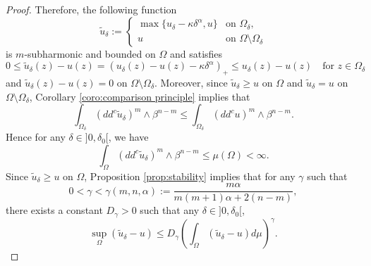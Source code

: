 \documentclass[11pt]{article}
\numberwithin{equation}{section}
\theoremstyle{definition}
\theoremstyle{plain}
\theoremstyle{definition}
\begin{document}
\begin{proof}
Therefore, the following function
\[
\tilde{u}_{\delta}:= \begin{cases}
\max\{{u}_{\delta} - \kappa \delta^{\alpha},u \} &\text{on } \Omega_{\delta}, \\
u &\text{on } \Omega\setminus\Omega_{\delta}
\end{cases}
\]
is $m$-subharmonic and bounded on $\Omega$ and satisfies
\[
0 \leq \tilde{u}_{\delta}(z) - u (z) =(u_\delta (z) - u (z) - \kappa \delta^{\alpha})_+ \leq u_\delta (z) - u (z)\quad \text{for }z\in \Omega_{\delta}
\]
and $\tilde{u}_{\delta}(z) - u (z) = 0$ on $\Omega \setminus \Omega_\delta$. Moreover, since $ \tilde{u}_{\delta} \geq u$ on $ \Omega$ and $\tilde{u}_{\delta} = u$ on $\Omega \setminus \Omega_\delta$, Corollary \ref{coro:comparison principle} implies that
\[
\int_{\Omega_\delta}(dd^c\tilde{u}_{\delta})^m\wedge\beta^{n-m}\leq\int_{\Omega_\delta}(dd^c u)^m\wedge\beta^{n-m}.
\]
Hence for any $\delta\in{}]0,\delta_0[$, we have
\[
\int_{\Omega}(dd^c\tilde{u}_{\delta})^m\wedge\beta^{n-m} \leq \mu (\Omega) < \infty.
\]
Since $\tilde u_\delta \geq u$ on $\Omega$, Proposition \ref{prop:stability} implies that for any $\gamma$ such that
\[
0<\gamma < \gamma (m,n,\alpha):= \frac{m \alpha}{ m (m + 1) \alpha + 2 (n-m)},
\]
there exists a constant $D_\gamma > 0$ such that any $\delta\in{}]0,\delta_0[$,
\begin{equation} \label{eq2}
\sup_{\Omega}(\tilde{u}_{\delta}-u) \leq D_{\gamma} \left(\int_{\Omega}(\tilde{u}_{\delta}-u) d\mu\right)^{\gamma}.
\end{equation}


\end{proof}
\end{document}
